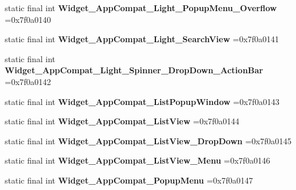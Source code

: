 \begin{DoxyCompactItemize}
\item 
\mbox{\label{classproject4_1_1xaria_1_1R_1_1style_ade058b4a26d2b5bc116fb543a85f4be4}} 
static final int {\bfseries Widget\+\_\+\+App\+Compat\+\_\+\+Light\+\_\+\+Popup\+Menu\+\_\+\+Overflow} =0x7f0a0140
\item 
\mbox{\label{classproject4_1_1xaria_1_1R_1_1style_a0fb6d7c249b1693f1ae4ad51fef4f2d7}} 
static final int {\bfseries Widget\+\_\+\+App\+Compat\+\_\+\+Light\+\_\+\+Search\+View} =0x7f0a0141
\item 
\mbox{\label{classproject4_1_1xaria_1_1R_1_1style_ae3cd453c06caddb7cdf0e5375cd7400a}} 
static final int {\bfseries Widget\+\_\+\+App\+Compat\+\_\+\+Light\+\_\+\+Spinner\+\_\+\+Drop\+Down\+\_\+\+Action\+Bar} =0x7f0a0142
\item 
\mbox{\label{classproject4_1_1xaria_1_1R_1_1style_af1e2fa52b4afa4b68e1fe24e8095fd76}} 
static final int {\bfseries Widget\+\_\+\+App\+Compat\+\_\+\+List\+Popup\+Window} =0x7f0a0143
\item 
\mbox{\label{classproject4_1_1xaria_1_1R_1_1style_a338571b91d6dec1e630735963a239367}} 
static final int {\bfseries Widget\+\_\+\+App\+Compat\+\_\+\+List\+View} =0x7f0a0144
\item 
\mbox{\label{classproject4_1_1xaria_1_1R_1_1style_a3643d82bcec9fbf9a6173985255e85ec}} 
static final int {\bfseries Widget\+\_\+\+App\+Compat\+\_\+\+List\+View\+\_\+\+Drop\+Down} =0x7f0a0145
\item 
\mbox{\label{classproject4_1_1xaria_1_1R_1_1style_ace1d7b6532e08437cb536fcc37044491}} 
static final int {\bfseries Widget\+\_\+\+App\+Compat\+\_\+\+List\+View\+\_\+\+Menu} =0x7f0a0146
\item 
\mbox{\label{classproject4_1_1xaria_1_1R_1_1style_adf0630c631a66ac1ddb8c1e595f17adf}} 
static final int {\bfseries Widget\+\_\+\+App\+Compat\+\_\+\+Popup\+Menu} =0x7f0a0147
\item 

\end{DoxyCompactItemize}
